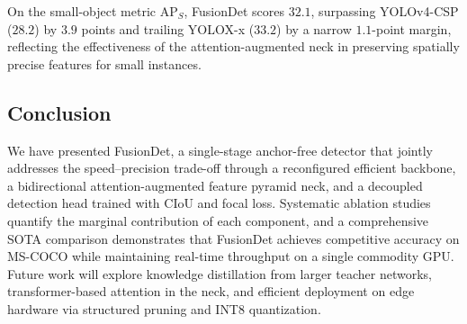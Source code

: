 On the small-object metric $\text{AP}_S$, FusionDet scores
$32.1$, surpassing YOLOv4-CSP ($28.2$) by $3.9$ points and
trailing YOLOX-x ($33.2$) by a narrow $1.1$-point margin,
reflecting the effectiveness of the attention-augmented neck in
preserving spatially precise features for small instances.

\subsection{Conclusion}
\label{sec:conclusion}

We have presented FusionDet, a single-stage anchor-free
detector that jointly addresses the speed--precision trade-off
through a reconfigured efficient backbone, a bidirectional
attention-augmented feature pyramid neck, and a decoupled
detection head trained with CIoU and focal loss.  Systematic
ablation studies quantify the marginal contribution of each
component, and a comprehensive SOTA comparison demonstrates
that FusionDet achieves competitive accuracy on MS-COCO while
maintaining real-time throughput on a single commodity GPU.
Future work will explore knowledge distillation from larger
teacher networks, transformer-based attention in the neck, and
efficient deployment on edge hardware via structured pruning
and INT8 quantization.
